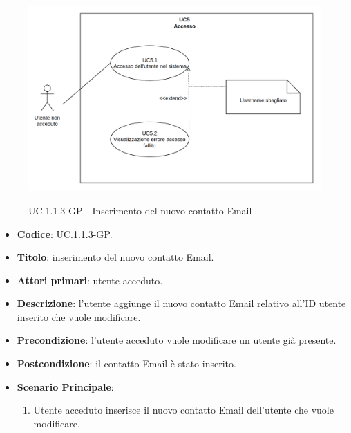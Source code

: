 				\begin{figure}[H]
					\centering
					\includegraphics[width=\columnwidth]{img/UC5.png}\\
					\caption{UC\theuccount.1.1.3-GP - Inserimento del nuovo contatto Email}
				\end{figure}
				\begin{itemize}
					\item \textbf{Codice}: UC\theuccount.1.1.3-GP.
					\item \textbf{Titolo}: inserimento del nuovo contatto Email.
					\item \textbf{Attori primari}: utente acceduto.
					\item \textbf{Descrizione}: l'utente aggiunge il nuovo contatto Email relativo all'ID utente inserito che vuole modificare.
					\item \textbf{Precondizione}: l'utente acceduto vuole modificare un utente già presente.
					\item \textbf{Postcondizione}: il contatto Email è stato inserito.
					\item \textbf{Scenario Principale}:
					\begin{enumerate}
						\item Utente acceduto inserisce il nuovo contatto Email dell'utente che vuole modificare.
					\end{enumerate}
				\end{itemize}
			
